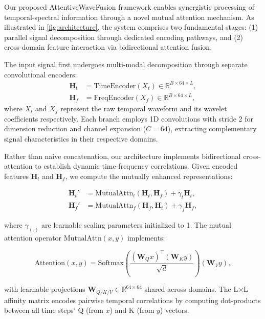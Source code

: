 \documentclass[12pt]{article}
\begin{document}
Our proposed AttentiveWaveFusion framework enables synergistic processing of temporal-spectral information through a novel mutual attention mechanism. As illustrated in \autoref{fig:architecture}, the system comprises two fundamental stages: (1) parallel signal decomposition through dedicated encoding pathways, and (2) cross-domain feature interaction via bidirectional attention fusion.


The input signal first undergoes multi-modal decomposition through separate convolutional encoders:
\begin{equation}
    \begin{aligned}
        \mathbf{H}_t & = \text{TimeEncoder}(X_t) \in \mathbb{R}^{B \times 64 \times L}, \\
        \mathbf{H}_f & = \text{FreqEncoder}(X_f) \in \mathbb{R}^{B \times 64 \times L},
    \end{aligned}
\end{equation}
where $X_t$ and $X_f$ represent the raw temporal waveform and its wavelet coefficients respectively. Each branch employs 1D convolutions with stride 2 for dimension reduction and channel expansion ($C=64$), extracting complementary signal characteristics in their respective domains.


Rather than naive concatenation, our architecture implements bidirectional cross-attention to establish dynamic time-frequency correlations. Given encoded features $\mathbf{H}_t$ and $\mathbf{H}_f$, we compute the mutually enhanced representations:

\begin{equation}
    \begin{aligned}
        \mathbf{H}_t' & = \text{MutualAttn}_t(\mathbf{H}_t, \mathbf{H}_f) + \gamma_t \mathbf{H}_t, \\
        \mathbf{H}_f' & = \text{MutualAttn}_f(\mathbf{H}_f, \mathbf{H}_t) + \gamma_f \mathbf{H}_f,
    \end{aligned}
\end{equation}

where $\gamma_{(\cdot)}$ are learnable scaling parameters initialized to 1. The mutual attention operator $\text{MutualAttn}(x,y)$ implements:

\begin{equation}
    \text{Attention}(x,y) = \text{Softmax}\left(\frac{(\mathbf{W}_Q x)^\top (\mathbf{W}_K y)}{\sqrt{d}}\right)(\mathbf{W}_V y),
\end{equation}

\noindent with learnable projections $\mathbf{W}_{Q/K/V} \in \mathbb{R}^{64 \times 64}$ shared across domains. The L×L affinity matrix encodes pairwise temporal correlations by computing dot-products between all time steps' Q (from $x$) and K (from $y$) vectors.
\end{document}
